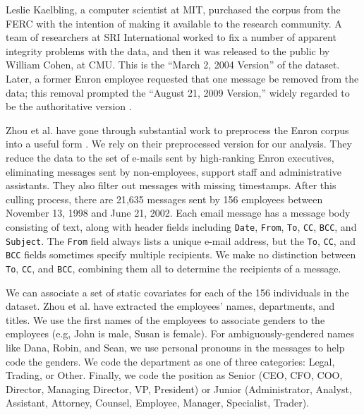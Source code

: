 \documentclass[aoas,preprint]{imsart}
\begin{document}
Leslie Kaelbling, a computer scientist at MIT, purchased the corpus from the FERC with the intention of making it available to the research community.  A team of researchers at SRI International worked to fix a number of apparent integrity problems with the data, and then it was released to the public by William Cohen, at CMU.  This is the ``March 2, 2004 Version'' of the dataset. Later, a former Enron employee requested that one message be removed from the data; this removal prompted the ``August 21, 2009 Version,'' widely regarded to be the authoritative version \cite{cohen2009enron}.

Zhou et al. have gone through substantial work to preprocess the Enron corpus into a useful form \cite{zhou2007strategies}.  We rely on their preprocessed version for our analysis.  They reduce the data to the set of e-mails sent by high-ranking Enron executives, eliminating messages sent by non-employees, support staff and administrative assistants.  They also filter out messages with missing timestamps.  After this culling process, there are 21,635 messages sent by 156 employees between November 13, 1998 and June 21, 2002.  Each email message has a message body consisting of text, along with header fields including \texttt{Date}, \texttt{From}, \texttt{To}, \texttt{CC}, \texttt{BCC}, and \texttt{Subject}.  The \texttt{From} field always lists a unique e-mail address, but the \texttt{To}, \texttt{CC}, and \texttt{BCC} fields sometimes specify multiple recipients.  We make no distinction between \texttt{To}, \texttt{CC}, and \texttt{BCC}, combining them all to determine the recipients of a message.

We can associate a set of static covariates for each of the 156 individuals in the dataset.  Zhou et al. have extracted the employees' names, departments, and titles.  We use the first names of the employees to associate genders to the employees (e.g, John is male, Susan is female).  For ambiguously-gendered names like Dana, Robin, and Sean, we use personal pronouns in the messages to help code the genders.  We code the department as one of three categories: Legal, Trading, or Other.  Finally, we code the position as Senior (CEO, CFO, COO, Director, Managing Director, VP, President) or Junior (Administrator, Analyst, Assistant, Attorney, Counsel, Employee, Manager, Specialist, Trader).




\end{document}
